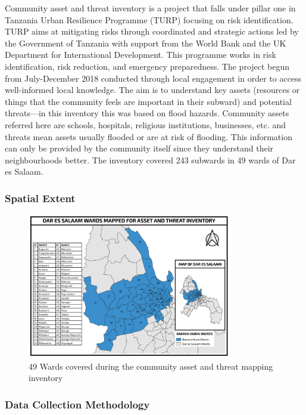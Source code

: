 \documentclass[a4paper,12pt,twoside]{article}
\begin{document}
\begin{multicols}{2}
Community asset and threat inventory is a project that falls under pillar one in Tanzania Urban Resilience Programme (TURP) focusing on risk identification. TURP aims at mitigating risks through coordinated and strategic actions led by the Government of Tanzania with support from the World Bank and the UK Department for International Development. This programme works in risk identification, risk reduction, and emergency preparedness.
The project begun from July-December 2018  conducted through local engagement  in order to access well-informed local knowledge. The aim is to understand key assets (resources or things that the community feels are important in their subward) and potential threats---in this inventory this was based on flood hazards. Community assets referred here are schools, hospitals, religious institutions, businesses, etc. and threats mean assets usually flooded or are at risk of flooding. This information can only be provided by the community itself since they understand their neighbourhoods better. The inventory covered  243 subwards in 49 wards of Dar es Salaam. 
\end{multicols}

\subsubsection{Spatial Extent}

\begin{figure}[h]
  \color{RHgreen}\caption{49 Wards covered during the community asset and threat mapping inventory}
  \centering
  \includegraphics[width=0.8\textwidth]{images/asset_and_threat_wards.png}
\end{figure}

\subsubsection{Data Collection Methodology}
\end{document}
